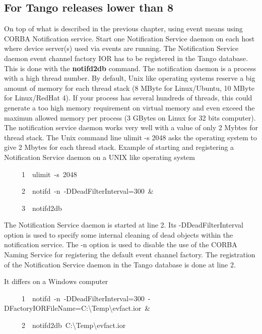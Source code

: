 \subsection{For Tango releases lower than 8}

On top of what is described in the previous chapter, using event means
using CORBA Notification service. Start one Notification Service
daemon on each host where device server(s) used via events are running.
The Notification Service daemon event channel factory IOR has to be
registered in the Tango database. This is done with the \textbf{notifd2db}
command. The notification daemon is a process with a high thread number.
By default, Unix like operating systems reserve a big amount of memory
for each thread stack (8 MByte for Linux/Ubuntu, 10 MByte for Linux/RedHat
4). If your process has several hundreds of threads, this could generate
a too high memory requirement on virtual memory and even exceed the
maximun allowed memory per process (3 GBytes on Linux for 32 bits
computer). The notification service daemon works very well with a
value of only 2 Mybtes for thread stack. The Unix command line \textquotedbl{}ulimit
-s 2048\textquotedbl{} asks the operating system to give 2 Mbytes
for each thread stack. Example of starting and registering a Notification
Service daemon on a UNIX like operating system


\begin{lyxcode}
~~~~~1~~ulimit~-s~2048

~~~~~2~~notifd~-n~-DDeadFilterInterval=300~\&

~~~~~3~~notifd2db
\end{lyxcode}


The Notification Service daemon is started at line 2. Its \textquotedbl{}-DDeadFilterInterval\textquotedbl{}
option is used to specify some internal cleaning of dead objects within
the notification service. The \textquotedbl{}-n\textquotedbl{} option
is used to disable the use of the CORBA Naming Service for registering
the default event channel factory. The registration of the Notification
Service daemon in the Tango database is done at line 2.

It differs on a Windows computer


\begin{lyxcode}
~~~~~1~~notifd~-n~-DDeadFilterInterval=300~-DFactoryIORFileName=C:\textbackslash{}Temp\textbackslash{}evfact.ior~\&

~~~~~2~~notifd2db~C:\textbackslash{}Temp\textbackslash{}evfact.ior
\end{lyxcode}


